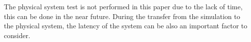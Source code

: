 \documentclass{article}
\begin{document}
The physical system test is not performed in this paper due to the lack of time, this can be done in the near future. During the transfer from the simulation to the physical system, the latency of the system can be also an important factor to consider.  

%
%
\end{document}
